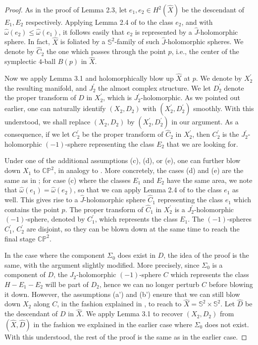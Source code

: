 \documentclass[11pt]{amsart}
\theoremstyle{plain}
\numberwithin{theorem}{section}
\theoremstyle{definition}
\newcommand{\C}{{\mathbb C}}
\renewcommand{\P}{{\mathbb P}}
\newcommand{\s}{{\mathbb S}}
\begin{document}
\begin{proof}
As in the proof of Lemma 2.3, let $e_1, e_2\in H^2(\hat{X})$ be the descendant of $E_1,E_2$ respectively. Applying Lemma 2.4 of \cite{C2} to the class $e_2$, and with $\hat{\omega}(e_2)\leq \hat{\omega}(e_1)$, it follows easily that $e_2$ is represented by a $\hat{J}$-holomorphic sphere. 
In fact, $\hat{X}$ is foliated by a $\s^2$-family of such $\hat{J}$-holomorphic spheres. We denote 
by $\hat{C}_2$ the one which passes through the point $p$, i.e., the center of the symplectic 
$4$-ball $B(p)$ in $\hat{X}$. 

Now we apply Lemma 3.1 and holomorphically blow up $\hat{X}$ at $p$. We denote by $X_2^\prime$ the resulting manifold, and $J_2^\prime$ the almost complex structure. We let $D_2^\prime$ denote the proper transform of $\hat{D}$ in $X_2^\prime$, which is $J_2^\prime$-holomorphic. As we pointed out earlier, one can naturally identify $(X_2,D_2)$ with 
 $(X_2^\prime,D_2^\prime)$ smoothly. With this understood, we shall replace $(X_2,D_2)$ by
 $(X_2^\prime,D_2^\prime)$ in our argument. As a consequence, if we let $C_2^\prime$ be the proper transform of $\hat{C}_2$ in $X_2^\prime$, then $C_2^\prime$ is the $J_2^\prime$-holomorphic
$(-1)$-sphere representing the class $E_2$ that we are looking for. 

Under one of the additional assumptions (c), (d), or (e), one can further blow down $X_1$ to $\C\P^2$, in analogy to \cite{C1}. More concretely, the cases (d) and (e) are the same as in \cite{C1}; for case (c) where the classes $E_1$ and $E_2$ have the same area, we note that 
$\hat{\omega}(e_1)= \hat{\omega}(e_2)$, so that we can apply Lemma 2.4 of \cite{C2} to the class $e_1$ as well. This gives rise to a $\hat{J}$-holomorphic sphere $\hat{C}_1$ representing the class $e_1$ which contains the point $p$. The proper transform of $\hat{C}_1$ in $X_2^\prime$ is a $J_2^\prime$-holomorphic $(-1)$-sphere, denoted by $C_1^\prime$, which represents the class $E_1$. The $(-1)$-spheres $C_1^\prime$, $C_2^\prime$ are disjoint, so they can be blown down at the same time to reach the final stage $\C\P^2$. 

In the case where the component $\Sigma_0$ does exist in $D$, the idea of the proof is the same, with the argument slightly modified. More precisely, since $\Sigma_0$ is a component of $D$, the $J_2$-holomorphic $(-1)$-sphere $C$ which represents the class $H-E_1-E_2$ will be part of $D_2$, hence we can no longer perturb $C$ before blowing it down. However, the assumptions (a') and (b') ensure that we can still blow down $X_2$ along $C$, in the fashion explained in \cite{C1}, to reach 
to $\hat{X}=\s^2\times\s^2$. Let $\hat{D}$ be the descendant of $D$ in $\hat{X}$. We apply 
Lemma 3.1 to recover $(X_2,D_2)$ from $(\hat{X},\hat{D})$ in the fashion we explained in the earlier case where
$\Sigma_0$ does not exist. 
With this understood, the rest of the proof is the same as in the earlier case. 

\end{proof}
\end{document}

